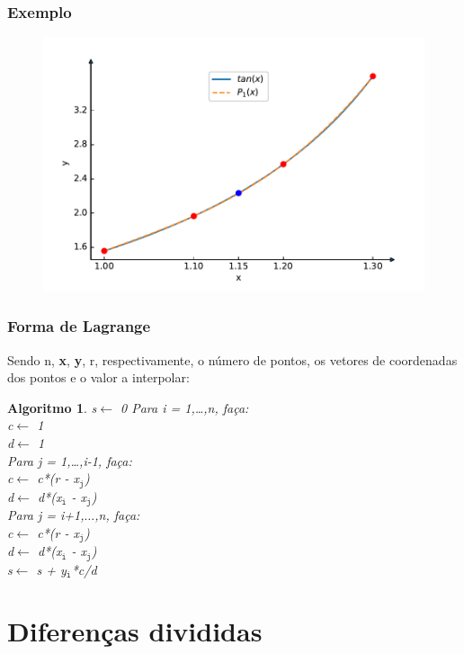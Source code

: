 \documentclass{beamer}
\theoremstyle{mystyle}
\newtheorem{algoritmo}[theorem]{Algoritmo}
\begin{document}
\begin{frame}
	\frametitle{Exemplo}
	\begin{figure}
		\centering
		\includegraphics[width=0.9\linewidth]{Figuras/grafico_05}
		\label{fig:grafico05}
	\end{figure}
\end{frame}

\begin{frame}
	\frametitle{Forma de Lagrange}
	Sendo n, \textbf{x}, \textbf{y}, r, respectivamente, o número de pontos, os vetores de coordenadas dos pontos e o valor a interpolar:
	\begin{algoritmo}
		s$\leftarrow$ 0
		Para i = 1,\ldots,n, faça:\\
		\quad c$\leftarrow$ 1\\
		\quad d$\leftarrow$ 1\\
		\quad Para j = 1,\ldots,i-1, faça:\\
		\quad\quad c$\leftarrow$ c*(r - x$ _{\texttt{j}}$)\\
		\quad\quad d$\leftarrow$ d*(x$ _{\texttt{i}}$ - x$ _{\texttt{j}}$)\\
		\quad Para j = i+1,$\ldots$,n, faça:\\
		\quad\quad c$\leftarrow$ c*(r - x$ _{\texttt{j}}$)\\
		\quad\quad d$\leftarrow$ d*(x$ _{\texttt{i}}$ - x$ _{\texttt{j}}$)\\
		\quad s$\leftarrow$ s + y$ _{\texttt{i}}$*c/d
	\end{algoritmo}
\end{frame}

\section{Diferenças divididas}
\end{document}
